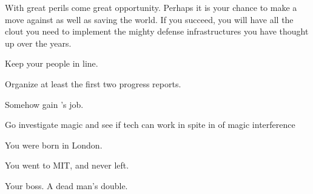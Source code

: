 \documentclass[char]{guildcamp3}
\begin{document}
With great perils come great opportunity. Perhaps it is your chance to make a move against \cPoliOne{} as well as saving the world. If you succeed, you will have all the clout you need to implement the mighty defense infrastructures you have thought up over the years.








\begin{itemz}[Goals]
  \item Keep your people in line.
  \item Organize at least the first two progress reports.
  \item Somehow gain \cPoliOne{}'s job.
  \item Go investigate magic and see if tech can work in spite in of magic interference
\end{itemz}

\begin{itemz}[Notes]
  \item You were born in London.
  \item You went to MIT, and never left.
\end{itemz}


\begin{contacts}
  \contact{\cPoliOne{}} Your boss.
  \contact{\cRogueOne{}} A dead man's double.
\end{contacts}
\end{document}
